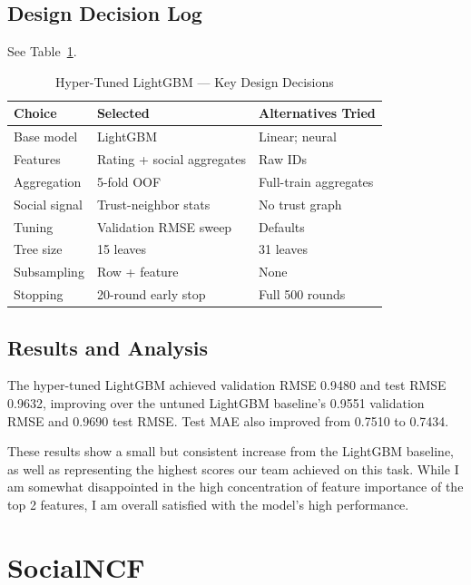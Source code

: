 \documentclass[conference]{IEEEtran}
\begin{document}
\subsection{Design Decision Log}

See Table~\ref{tab:decisions-tuned-lgbm}.

\begin{table}[htbp]
\caption{Hyper-Tuned LightGBM --- Key Design Decisions}
\label{tab:decisions-tuned-lgbm}
\centering
\begin{tabular}{p{2.5cm}p{2.5cm}p{2.5cm}}
\toprule
\textbf{Choice} & \textbf{Selected} & \textbf{Alternatives Tried} \\
\midrule
Base model & LightGBM & Linear; neural \\
Features & Rating + social aggregates & Raw IDs \\
Aggregation & 5-fold OOF & Full-train aggregates \\
Social signal & Trust-neighbor stats & No trust graph \\
Tuning & Validation RMSE sweep & Defaults \\
Tree size & 15 leaves & 31 leaves \\
Subsampling & Row + feature & None \\
Stopping & 20-round early stop & Full 500 rounds \\
\bottomrule
\end{tabular}
\end{table}

\subsection{Results and Analysis}

The hyper-tuned LightGBM achieved validation RMSE 0.9480 and test RMSE 0.9632, improving over the untuned LightGBM baseline's 0.9551 validation RMSE and 0.9690 test RMSE. Test MAE also improved from 0.7510 to 0.7434.

These results show a small but consistent increase from the LightGBM baseline, as well as representing the highest scores our team achieved on this task. While I am somewhat disappointed in the high concentration of feature importance of the top 2 features, I am overall satisfied with the model's high performance.

\section{SocialNCF}
\label{sec:social-ncf}
\end{document}
